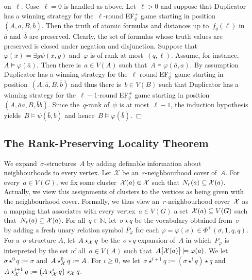 \documentclass[11pt]{article}
\numberwithin{equation}{section}
\newcommand{\N}{{\mathbb N}} \newcommand{\Q}{{\mathbb Q}}
\renewcommand{\phi}{\varphi}
\newcommand{\tup}[1]{\bar{#1}}
\def\qed{\hspace*{\fill}$\Box$}
\newenvironment{proof}[1][]%
{\ifthenelse{\equal{#1}{}}{\noindent\textit{Proof.
    }}{\noindent\textit{#1. }}}%
{\qed\par\smallskip}
\begin{document}
\begin{proof}
  on~${\ell}$. Case~${\ell}=0$ is handled as above. Let~${\ell}>0$ and
  suppose that Duplicator has a winning strategy for
  the~${\ell}$-round EF$_q^+$ game starting in position~$(A,\tup{a},B,
  \tup{b})$. Then the truth of atomic formulas and distances up
  to~$f_q({\ell})$ in~$\tup{a}$ and~$\tup{b}$ are preserved. Clearly,
  the set of formulas whose truth values are preserved is closed under
  negation and disjunction. Suppose that~$\phi(\tup{x})=\exists
  y\psi(\tup{x},y)$ and~$\phi$ is of rank at
  most~$(q,{\ell})$. Assume, for
  instance,~$A\models\phi(\tup{a})$. Then there is~$a\in V(A)$ such
  that~$A\models\phi(\tup{a}, a)$. By assumption Duplicator has a
  winning strategy for the~${\ell}$-round EF$_q^+$ game starting in
  position~$(A,\tup{a},B, \tup{b})$ and thus there is~$b\in V(B)$ such
  that Duplicator has a winning strategy for the~${\ell}-1$-round
  EF$_q^+$ game starting in position~$(A,\tup{a}a,B, \tup{b}b)$. Since
  the~$q$-rank of~$\psi$ is at most~${\ell}-1$, the induction
  hypothesis yields~$B\models\psi(\tup{b},b)$ and
  hence~$B\models\phi(\tup{b})$.
\end{proof}

\subsection{The Rank-Preserving Locality Theorem}
\label{sec:rpl}

We expand~$\sigma$-structures~$A$ by adding definable information
about neighbourhoods to every vertex. Let $\mathcal X$ be
an~$r$-neighbourhood cover of~$A$. For every~$a\in V(G)$, we fix some
cluster~${\mathcal X}(a)\in\mathcal{X}$ such that $N_r(a)\subseteq
{\mathcal{X}}(a)$. Actually, we view this assignments of clusters to the
vertices as being given with the neighbourhood cover. Formally, we
thus view an~$r$-neighbourhood cover~$\mathcal{X}$ as a mapping that
associates with every vertex~$a\in V(G)$ a set~${\mathcal{X}}(a)\subseteq
V(G)$ such that~$N_r(a)\subseteq {\mathcal{X}}(a)$.  For all~$q\in\N$,
let~$\sigma\star q$ be the vocabulary obtained from~$\sigma$ by adding
a fresh unary relation symbol $P_\phi$ for each
$\phi=\phi(x)\in\Phi^+(\sigma,1,q,q)$. For a~$\sigma$-structure $A$,
let~$A\star_{\mathcal{X}}q$ be the~$\sigma\star q$-expansion of~$A$ in
which~$P_\phi$ is interpreted by the set of all~$a\in V(A)$ such
that~$A\big[{\XXX}(a)\big]\models\phi(a)$.  We let~$\sigma\star^0
q:=\sigma$ and~$A\star_{\mathcal{X}}^0 q:=A$. For $i\ge 0$, we
let~$\sigma\star^{i+1} q:=(\sigma\star^i q)\star q$ and
$A\star_{\mathcal{X}}^{i+1} q:=\big(A\star_{\mathcal{X}}^{i}q\big)\star_{\mathcal{X}}q$.
\end{document}
